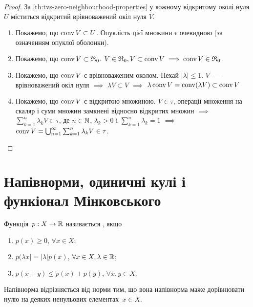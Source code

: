 \begin{proof}
    За \cref{th:tvs-zero-neighbourhood-properties} у кожному відкритому околі нуля $U$ міститься відкритий врівноважений окіл нуля $V$.
    
    \begin{enumerate}
        \item Покажемо, що $\operatorname{conv} V \subset U$. Опуклість цієї множини є очевидною (за означенням опуклої оболонки).

        \item Покажемо, що $\operatorname{conv} V \subset \mathfrak{R}_0$. $V \in \mathfrak{R}_0, V \subset \operatorname{conv} V \implies \operatorname{conv} V \in \mathfrak{R}_0$.

        \item Покажемо, що $\operatorname{conv} V$ є врівноваженим околом. Нехай $|\lambda| \le 1$. $V$~--- врівноважений окіл нуля $\implies$ $\lambda V \subset V$ $\implies$ $\lambda \operatorname{conv} V = \operatorname{conv} (\lambda V) \subset \operatorname{conv} V$

        \item Покажемо, що $\operatorname{conv} V$ є відкритою множиною. $V \in \tau$, операції множення на скаляр і суми множин замкнені відносно відкритих множин $\implies$ $\sum_{k = 1}^n \lambda_k V \in \tau$, де $n \in \mathbb{N}$, $\lambda_k > 0$ і $\sum_{k = 1}^n \lambda_k = 1$ $\implies$ $\operatorname{conv} V = \bigcup_{n = 1}^\infty \sum_{k = 1}^n \lambda_k V \in \tau$. \qedhere
    \end{enumerate}
\end{proof}

\section{Напівнорми, одиничні кулі і функіонал Мінковського}

\begin{definition}
    Функція~$p: X \to \mathbb{R}$ називається , якщо
    \begin{enumerate}
        \item $p(x) \ge 0$, $\forall x \in X$;
        \item $p(\lambda x| = |\lambda| p(x)$, $\forall x \in X, \lambda \in \mathbb{R}$;
        \item $p(x + y) \le p(x) + p(y)$, $\forall x, y \in X$.
    \end{enumerate}
\end{definition}

\begin{remark}
    Напівнорма відрізняється від норми тим, що вона напівнорма маже дорівнювати нулю на деяких ненульових елементах~$x \in X$.
\end{remark}

